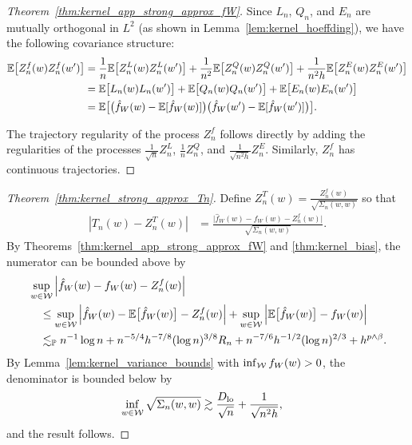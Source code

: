 \begin{proof}[Theorem~\ref{thm:kernel_app_strong_approx_fW}]
  Since $L_n$, $Q_n$, and $E_n$
  are mutually orthogonal in $L^2$
  (as shown in Lemma~\ref{lem:kernel_hoeffding}),
  we have the following covariance
  structure:
  \begin{align*}
    \mathbb{E}\big[Z_n^f(w) Z_n^f(w')\big]
    &=
    \frac{1}{n} \mathbb{E}\big[ Z_n^L(w) Z_n^L(w') \big]
    + \frac{1}{n^2} \mathbb{E}\big[ Z_n^Q(w) Z_n^Q(w') \big]
    + \frac{1}{n^2h} \mathbb{E}\big[ Z_n^E(w) Z_n^E(w') \big] \\
    &=
    \mathbb{E}\big[ L_n(w) L_n(w') \big]
    + \mathbb{E}\big[ Q_n(w) Q_n(w') \big]
    + \mathbb{E}\big[ E_n(w) E_n(w') \big] \\
    &=
    \mathbb{E}\big[
      \big(\hat f_W(w) - \mathbb{E}[\hat f_W(w)]\big)
      \big(\hat f_W(w') - \mathbb{E}[\hat f_W(w')]\big)
    \big].
  \end{align*}


  The trajectory regularity of the process
  $Z_n^f$ follows directly by adding the regularities
  of the processes $\frac{1}{\sqrt n} Z_n^L$,
  $\frac{1}{n} Z_n^Q$, and $\frac{1}{\sqrt{n^2h}} Z_n^E$.
  Similarly, $Z_n^f$ has continuous trajectories.
\end{proof}

\begin{proof}[Theorem~\ref{thm:kernel_strong_approx_Tn}]

  Define $Z_n^T(w) = \frac{Z_n^f(w)}{\sqrt{\Sigma_n(w,w)}}$ so that
  \begin{align*}
    \left| T_n(w) - Z_n^T(w) \right|
    &= \frac{\big| \hat f_W(w) - f_W(w) - Z_n^f(w) \big|}
    {\sqrt{\Sigma_n(w,w)}}.
  \end{align*}
  By Theorems~\ref{thm:kernel_app_strong_approx_fW} and \ref{thm:kernel_bias},
  the numerator can be bounded above by
  \begin{align*}
    &\sup_{w \in \mathcal{W}}
    \left|
    \hat f_W(w) - f_W(w)
    -
    Z_n^f(w)
    \right| \\
    &\quad\leq
    \sup_{w \in \mathcal{W}}
    \left|
    \hat f_W(w)
    - \mathbb{E}\big[\hat f_W(w)\big]
    -
    Z_n^f(w)
    \right|
    + \sup_{w \in \mathcal{W}}
    \left|
    \mathbb{E}\big[\hat f_W(w)\big]
    - f_W(w)
    \right| \\
    &\quad\lesssim_{\mathbb{P}}
    n^{-1} \log n
    + n^{-5/4} h^{-7/8} (\log n)^{3/8} R_n
    + n^{-7/6} h^{-1/2} (\log n)^{2/3}
    + h^{p \wedge \beta}.
  \end{align*}
  By Lemma~\ref{lem:kernel_variance_bounds}
  with $\inf_{\mathcal{W}} f_W(w) > 0$,
  the denominator is bounded below by
  \begin{align*}
    \inf_{w \in \mathcal{W}}
    \sqrt{\Sigma_n(w,w)}
    &\gtrsim
    \frac{D_{\textup{lo}}}{\sqrt n} + \frac{1}{\sqrt{n^2h}},
  \end{align*}
  and the result follows.
\end{proof}

